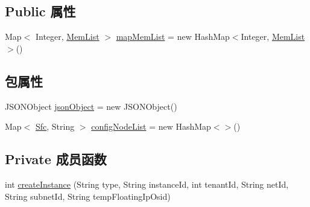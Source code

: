 \subsection*{Public 属性}
\begin{DoxyCompactItemize}
\item 
Map$<$ Integer, \mbox{\hyperlink{classcom_1_1example_1_1demo_1_1modular_1_1_mem_list}{Mem\+List}} $>$ \mbox{\hyperlink{classcom_1_1example_1_1demo_1_1templates_1_1_json_template_lexer_a5270e8f81c1a11a1c8a8ee63af6dedbb}{map\+Mem\+List}} = new Hash\+Map$<$Integer, \mbox{\hyperlink{classcom_1_1example_1_1demo_1_1modular_1_1_mem_list}{Mem\+List}}$>$()
\end{DoxyCompactItemize}
\subsection*{包属性}
\begin{DoxyCompactItemize}
\item 
J\+S\+O\+N\+Object \mbox{\hyperlink{classcom_1_1example_1_1demo_1_1templates_1_1_json_template_lexer_aac5b639db21a6a0f40f2e3e099e6c2ef}{json\+Object}} = new J\+S\+O\+N\+Object()
\item 
Map$<$ \mbox{\hyperlink{classcom_1_1example_1_1demo_1_1modular_1_1_sfc}{Sfc}}, String $>$ \mbox{\hyperlink{classcom_1_1example_1_1demo_1_1templates_1_1_json_template_lexer_acd66a79ae741b3f79cbcf3ae3b2fceb9}{config\+Node\+List}} = new Hash\+Map$<$$>$()
\end{DoxyCompactItemize}
\subsection*{Private 成员函数}
\begin{DoxyCompactItemize}
\item 
int \mbox{\hyperlink{classcom_1_1example_1_1demo_1_1templates_1_1_json_template_lexer_adf6316bac6b782e02ffecfa5582e8b76}{create\+Instance}} (String type, String instance\+Id, int tenant\+Id, String net\+Id, String subnet\+Id, String temp\+Floating\+Ip\+Osid)
\end{DoxyCompactItemize}

